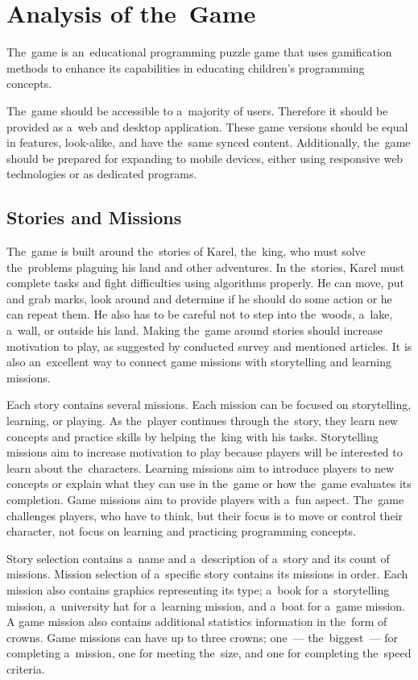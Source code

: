 \section{Analysis of the~Game}
\label{analysis:game}

The~game \emph{\myAppName} is an~educational programming puzzle game that uses gamification methods to enhance its capabilities in educating children's programming concepts.

The~game should be accessible to a~majority of users.
Therefore it should be provided as a~web and desktop application.
These game versions should be equal in features, look-alike, and have the~same synced content.
Additionally, the~game should be prepared for expanding to mobile devices, either using responsive web technologies or as dedicated programs.

\subsection{Stories and Missions}
\label{analysis:game:stories-and-missions}

The~game is built around the~stories of Karel, the~king, who must solve the~problems plaguing his land and other adventures.
In the~stories, Karel must complete tasks and fight difficulties using algorithms properly.
He can move, put and grab marks, look around and determine if he should do some action or he can repeat them.
He also has to be careful not to step into the~woods, a~lake, a~wall, or outside his land.
Making the~game around \mbox{stories} should increase motivation to play, as suggested by conducted survey and mentioned articles.
It is also an~excellent way to connect game missions with storytelling and learning missions.

Each story contains several missions.
Each mission can be focused on storytelling, learning, or playing.
As the~player continues through the~story, they learn new concepts and practice skills by helping the~king with his tasks.
Storytelling missions aim to increase motivation to play because players will be interested to learn about the~characters.
Learning missions aim to introduce players to new concepts or explain what they can use in the~game or how the~game evaluates its completion.
Game missions aim to provide players with a~fun aspect.
The~game challenges players, who have to think, but their focus is to move or control their character, not focus on learning and practicing programming concepts.

Story selection contains a~name and a~description of a~story and its count of missions.
Mission selection of a~specific story contains its missions in order.
Each mission also contains graphics representing its type; a~book for a~storytelling mission, a~university hat for a~learning mission, and a~boat for a~game mission.
A game mission also contains additional statistics information in the~form of crowns.
Game missions can have up to three crowns; one~--- the~biggest~--- for completing a~mission, one for meeting the~size, and one for completing the~speed criteria.

